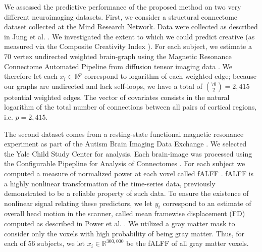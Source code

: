 \documentclass{article}
\newcommand{\Real}{\mathbb{R}}
\begin{document}
We assessed the predictive performance of the proposed method on two very different neuroimaging datasets. First, we consider a structural connectome dataset collected at the Mind Research Network.  Data were collected as described in Jung et al. .
We investigated the extent to which we could predict creative (as measured via the Composite Creativity Index \cite{Arden2010}).   For each subject, we estimate a $70$ vertex undirected weighted brain-graph using the Magnetic Resonance Connectome Automated Pipeline \cite{MRCAP11} from diffusion tensor imaging data \cite{Mori2006}. We therefore let each $x_i \in \Real^p$ correspond to logarithm of each weighted edge; because our graphs are undirected and lack self-loops, we have a total of $\binom{70}{2}=2,415$ potential weighted edges.
The vector of covariates consists in the natural logarithm of the total number of connections between all pairs of cortical regions, i.e. $p=2,415$. 

The second dataset comes from a resting-state functional magnetic resonance experiment as part of the Autism Brain Imaging Data Exchange \cite{Autism}.  We selected the Yale Child Study Center for analysis.  Each brain-image was processed using the Configurable Pipepline for Analysis of Connectomes \cite{cpac}. For each subject we computed a measure of normalized power at each voxel called fALFF \cite{Zou2008}.  fALFF is a highly nonlinear transformation of the time-series data, previously demonstrated to be a reliable property of such data.  To ensure the existence of nonlinear signal relating these predictors, we let $y_i$ correspond to an estimate of overall head motion in the scanner, called mean framewise displacement (FD) computed as described in Power et al. .  We utilized a gray matter mask to consider only the voxels with high probability of being gray matter. Thus, for each of $56$ subjects, we let $x_i \in \Real^{300,000}$ be the fALFF of all gray matter voxels.

\end{document}
